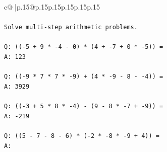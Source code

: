 \documentclass{article}
\begin{document}
{\begin{supertabular}{c@{$\;$}|p{.15\linewidth}@{}p{.15\linewidth}p{.15\linewidth}p{.15\linewidth}p{.15\linewidth}p{.15\linewidth}}
{{{\\ 
\\ 
\texttt{Solve multi{-}step arithmetic problems.} \\
\\ 
\texttt{Q: (({-}5 + 9 * {-}4 {-} 0) * (4 + {-}7 + 0 * {-}5)) =} \\
\texttt{A: 123} \\
\\ 
\texttt{Q: (({-}9 * 7 * 7 * {-}9) + (4 * {-}9 {-} 8 {-} {-}4)) =} \\
\texttt{A: 3929} \\
\\ 
\texttt{Q: (({-}3 + 5 * 8 * {-}4) {-} (9 {-} 8 * {-}7 + {-}9)) =} \\
\texttt{A: {-}219} \\
\\ 
\texttt{Q: ((5 {-} 7 {-} 8 {-} 6) * ({-}2 * {-}8 * {-}9 + 4)) =} \\
\texttt{A:} \\
            }
        }
    }
     \\ \\


\end{supertabular}}
\end{document}
